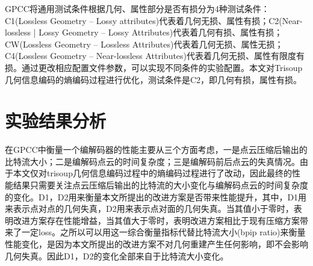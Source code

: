 \documentclass[bachelor,print,msfonts]{xduthesis}
\begin{document}
GPCC将通用测试条件根据几何、属性部分是否有损分为4种测试条件：C1(Lossless Geometry – Lossy attributes)代表着几何无损、属性有损；C2(Near-lossless | Lossy Geometry – Lossy Attributes)代表着几何有损、属性有损；CW(Lossless Geometry – Lossless Attributes)代表着几何无损、属性无损；C4(Lossless Geometry – Near-lossless Attributes)代表着几何无损、属性有限度有损。通过更改相应配置文件参数，可以实现不同条件的实验配置。本文对Trisoup几何信息编码的熵编码过程进行优化，测试条件是C2，即几何有损，属性有损。


\section{实验结果分析}
在GPCC中衡量一个编解码器的性能主要从三个方面考虑，一是点云压缩后输出的比特流大小；二是编解码点云的时间复杂度；三是编解码前后点云的失真情况。由于本文仅对trisoup几何信息编码过程中的熵编码过程进行了改动，因此最终的性能结果只需要关注点云压缩后输出的比特流的大小变化与编解码点云的时间复杂度的变化。D1，D2用来衡量本文所提出的改进方案是否带来性能提升，其中，D1用来表示点对点的几何失真，D2用来表示点对面的几何失真。当其值小于零时，表明改进方案存在性能增益，当其值大于零时，表明改进方案相比于现有压缩方案带来了一定loss。之所以可以用这一综合衡量指标代替比特流大小(bpip ratio)来衡量性能变化，是因为本文所提出的改进方案不对几何重建产生任何影响，即不会影响几何失真。因此D1，D2的变化全部来自于比特流大小变化。
\end{document}
